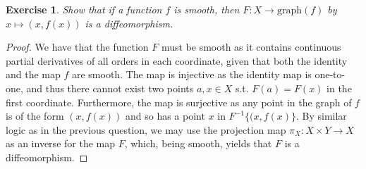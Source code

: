\documentclass{article}
\newtheorem{exercise}{Exercise}
\begin{document}
    \begin{exercise}
Show that if a function $f$ is smooth, then $F: X \to \text{graph}(f)$ by $x \mapsto (x,f(x))$ is a diffeomorphism. 
    \end{exercise}
    \begin{proof}
    We have that the function $F$ must be smooth as it contains continuous partial derivatives of all orders in each coordinate, given that both the identity and the map $f$ are smooth. The map is injective as the identity map is one-to-one, and thus there cannot exist two points $a, x \in X$ s.t. $F(a) = F(x)$ in the first coordinate. Furthermore, the map is surjective as any point in the graph of $f$ is of the form $(x,f(x))$ and so has a point $x$ in $F^{-1}\{(x,f(x)\}$. By similar logic as in the previous question, we may use the projection map $\pi_{X}: X \times Y \to X$ as an inverse for the map $F$, which, being smooth, yields that $F$ is a diffeomorphism. 
    \end{proof}
    
  
\end{document}

